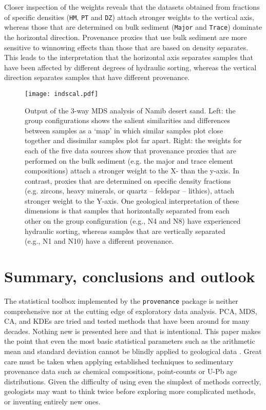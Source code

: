 \documentclass[11pt]{article}
\begin{document}
\begin{enumerate}
Closer inspection of the weights reveals that the datasets obtained
from fractions of specific densities (\texttt{HM}, \texttt{PT} and
\texttt{DZ}) attach stronger weights to the vertical axis, whereas
those that are determined on bulk sediment (\texttt{Major} and
\texttt{Trace}) dominate the horizontal direction. Provenance proxies
that use bulk sediment are more sensitive to winnowing effects than
those that are based on density separates. This leads to the
interpretation that the horizontal axis separates samples that have
been affected by different degrees of hydraulic sorting, whereas the
vertical direction separates samples that have different provenance.

\end{enumerate}

\begin{figure}[!ht]
  \texttt{[image: indscal.pdf]}
  \caption{Output of the 3-way MDS analysis of Namib desert
    sand. Left: the group configurations shows the salient
    similarities and differences between samples as a `map' in which
    similar samples plot close together and dissimilar samples plot
    far apart. Right: the weights for each of the five data sources
    show that provenance proxies that are performed on the bulk
    sediment (e.g. the major and trace element compositions) attach a
    stronger weight to the X- than the y-axis. In contrast, proxies
    that are determined on specific density fractions (e.g. zircons,
    heavy minerals, or quartz -- feldspar -- lithics), attach stronger
    weight to the Y-axis. One geological interpretation of these
    dimensions is that samples that horizontally separated from each
    other on the group configuration (e.g., N4 and N8) have
    experienced hydraulic sorting, whereas samples that are vertically
    separated (e.g., N1 and N10) have a different provenance.}
  \label{fig:INDSCAL}
\end{figure}

\section{Summary, conclusions and outlook}
\label{sec:conclusions}

The statistical toolbox implemented by the \texttt{provenance} package
is neither comprehensive nor at the cutting edge of exploratory data
analysis. PCA, MDS, CA, and KDEs are tried and tested methods that
have been around for many decades.  Nothing new is presented here and
that is intentional. This paper makes the point that even the most
basic statistical parameters such as the arithmetic mean and standard
deviation cannot be blindly applied to geological data
\citep{chayes1949, chayes1960, weltje2002}. Great care must be taken
when applying established techniques to sedimentary provenance data
such as chemical compositions, point-counts or U-Pb age distributions.
Given the difficulty of using even the simplest of methods correctly,
geologists may want to think twice before exploring more complicated
methods, or inventing entirely new ones.\\
\end{document}
